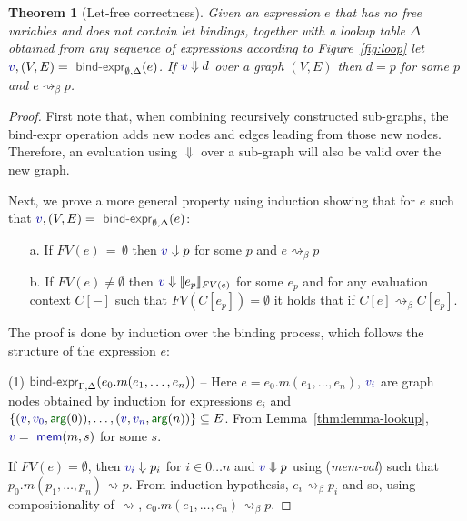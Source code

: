 \documentclass[acmsmall,anonymous,fleqn]{acmart}\settopmatter{printfolios=false,printccs=false,printacmref=false}
\newcounter{thc}
\theoremstyle{plain}
\newtheorem{theorem}[thc]{Theorem}
\theoremstyle{definition}
\newcommand{\ident}[1]{\textnormal{\textcolor{idclr}{\sffamily #1}}}
\newcommand{\bndclr}[1]{\textcolor{kvdclr}{#1}}
\newcommand{\bnd}[1]{\textnormal{\textcolor{kvdclr}{\sffamily #1}}}
\newcommand{\blbl}[1]{\textnormal{\textcolor{numclr}{\sffamily #1}}}
\begin{document}
\setcounter{thc}{-1}
\begin{theorem}[Let-free correctness]
Given an expression $e$ that has no free variables and does not contain let bindings, together
with a lookup table $\Delta$ obtained from any sequence of expressions according to Figure~\ref{fig:loop}
let $\bndclr{v}, (V, E) = \ident{bind-expr}_{\emptyset, \Delta}(e)$. If $\bndclr{v}\Downarrow d$
over a graph $(V, E)$ then $d = p$ for some $p$ and $e \rightsquigarrow_\beta p$.
\end{theorem}
\begin{proof}
First note that, when combining recursively constructed sub-graphs, the \ident{bind-expr} operation
adds new nodes and edges leading from those new nodes. Therefore, an evaluation using $\Downarrow$
over a sub-graph will also be valid over the new graph.

Next, we prove a more general property using induction showing that for $e$ such
that $\bndclr{v}, (V, E) = \ident{bind-expr}_{\emptyset, \Delta}(e)$:
\begin{enumerate}
\item[a.] If $FV(e)\,=\,\emptyset$ then $\bndclr{v} \Downarrow p$ for some $p$ and $e \rightsquigarrow_\beta p$
\item[b.] If $FV(e)\neq\emptyset$ then $\bndclr{v} \Downarrow \llbracket e_p \rrbracket_{FV(e)}$ for some $e_p$ and
  for any evaluation context $C[-]$ such that $FV(C[e_p])=\emptyset$ it holds that if
  $C[e] \rightsquigarrow_\beta C[e_p]$.
\end{enumerate}

The proof is done by induction over the binding process, which follows the structure
of the expression $e$:

\vspace{0.75em}\noindent(1) $\ident{bind-expr}_{\Gamma, \Delta}(e_0.m(e_1, \ldots, e_n))$ --
  Here $e = e_0.m(e_1, \ldots, e_n)$, $\bndclr{v_i}$ are graph nodes obtained by induction for
  expressions $e_i$ and $\{ (\bndclr{v}, \bndclr{v_0}, \blbl{arg}(0)), \ldots, (\bndclr{v}, \bndclr{v_n}, \blbl{arg}(n))\} \subseteq E$.
  From Lemma~\ref{thm:lemma-lookup}, $\bndclr{v} = \bnd{mem}(m, s)$ for some $s$.

  If $FV(e)=\emptyset$, then $\bndclr{v_i} \Downarrow p_i$ for $i\in 0\ldots n$ and
  $\bndclr{v}\Downarrow p$ using (\emph{mem-val}) such that $p_0.m(p_1, \ldots, p_n) \rightsquigarrow p$.
  From induction hypothesis, $e_i \rightsquigarrow_\beta p_i$ and so, using compositionality of $\rightsquigarrow$,
  $e_0.m(e_1, \ldots, e_n) \rightsquigarrow_\beta p$.


\end{proof}
\end{document}
